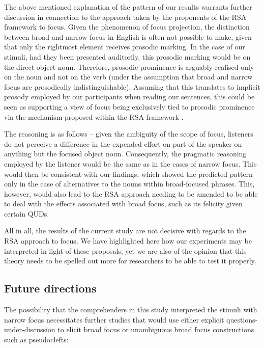 \documentclass[output=paper,colorlinks,citecolor=brown]{langscibook}
\begin{document}
The above mentioned explanation of the pattern of our results warrants further discussion in connection to the approach taken by the proponents of the RSA framework to focus. Given the phenomenon of focus projection, the distinction between broad and narrow focus in English is often not possible to make, given that only the rightmost element receives prosodic marking. In the case of our stimuli, had they been presented auditorily, this prosodic marking would be on the direct object noun. Therefore, prosodic prominence is arguably realised only on the noun and not on the verb (under the assumption that broad and narrow focus are prosodically indistinguishable). Assuming that this translates to implicit prosody employed by our participants when reading our sentences, this could be seen as supporting a view of focus being exclusively tied to prosodic prominence via the mechanism proposed within the RSA framework \citep{bergen2015strategic,stevens2016focus,stevens2019noise}. 


The reasoning is as follows -- given the ambiguity of the scope of focus, listeners do not perceive a difference in the expended effort on part of the speaker on anything but the focused object noun. Consequently, the pragmatic reasoning employed by the listener would be the same as in the cases of narrow focus. This would then be consistent with our findings, which showed the predicted pattern only in the case of alternatives to the nouns within broad-focused phrases. This, however, would also lead to the RSA approach needing to be amended to be able to deal with the effects associated with broad focus, such as its felicity given certain QUDs.


All in all, the results of the current study are not decisive with regards to the RSA approach to focus. We have highlighted here how our experiments may be interpreted in light of these proposals, yet we are also of the opinion that this theory needs to be spelled out more for researchers to be able to test it properly.


\subsection{Future directions}\label{future.directions}

The possibility that the comprehenders in this study interpreted the stimuli with narrow focus necessitates further studies that would use either explicit questions-under-discussion to elicit broad focus or unambiguous broad focus constructions such as pseudoclefts:
\end{document}
